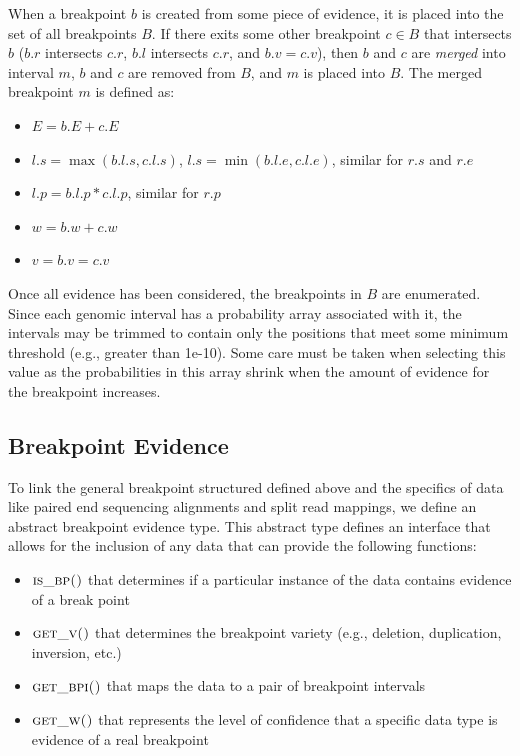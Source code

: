 \documentclass[11pt]{article}
\begin{document}
When a breakpoint $b$ is created from some piece of evidence, it is placed into
the set of all breakpoints $B$.  If there exits some other breakpoint $c \in B$
that intersects $b$ ($b.r$ intersects $c.r$, $b.l$ intersects $c.r$, and $b.v =
c.v$), then $b$ and $c$ are {\em merged} into interval $m$, $b$ and $c$ are
removed from $B$, and $m$ is placed into $B$.  The merged breakpoint $m$ is
defined as:
\begin{itemize}
\item $E = b.E + c.E$
\item $l.s = \max(b.l.s, c.l.s)$, $l.s = \min(b.l.e, c.l.e)$, similar for
$r.s$ and $r.e$
\item $l.p = b.l.p * c.l.p$, similar for $r.p$
\item $w = b.w + c.w$
\item $v = b.v = c.v$
\end{itemize}

Once all evidence has been considered, the breakpoints in $B$ are enumerated.
Since each genomic interval has a probability array associated with it, the
intervals may be trimmed to contain only the positions that meet some minimum
threshold (e.g., greater than 1e-10).  Some care must be taken when selecting
this value as the probabilities in this array shrink when the amount of evidence
for the breakpoint increases.


\subsection{Breakpoint Evidence}

To link the general breakpoint structured defined above and the specifics of
data like paired end sequencing alignments and split read mappings, we define
an abstract breakpoint evidence type.  This abstract type defines an interface
that allows for the inclusion of any data that can provide the following
functions:
\begin{itemize}
	\item $\textsc{is\_bp()}$ that determines if a particular
	instance of the data contains evidence of a break point
	\item $\textsc{get\_v()}$ that determines the breakpoint 
	variety (e.g., deletion, duplication, inversion, etc.)
	\item $\textsc{get\_bpi()}$ that maps the data to a pair of
	breakpoint intervals
	\item $\textsc{get\_w()}$ that represents the level of confidence
	that a specific data type is evidence of a real breakpoint
\end{itemize}
\end{document}
